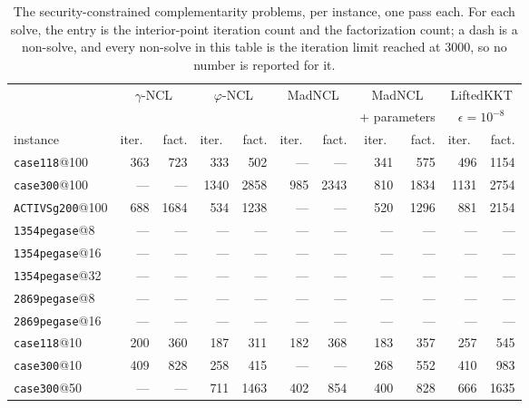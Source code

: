 \begin{table}[tbp]\centering\small\setlength{\tabcolsep}{3pt}
\caption{The security-constrained complementarity problems, per instance, one pass each. For each solve, the entry is the interior-point iteration count and the factorization count; a dash is a non-solve, and every non-solve in this table is the iteration limit reached at 3000, so no number is reported for it.}
\label{tab:gpu-scopf}
\begin{tabular}{lrrrrrrrrrr}\toprule
 & \multicolumn{2}{c}{$\gamma$-NCL} & \multicolumn{2}{c}{$\varphi$-NCL} & \multicolumn{2}{c}{MadNCL} & \multicolumn{2}{c}{MadNCL} & \multicolumn{2}{c}{LiftedKKT} \\
 & \multicolumn{2}{c}{} & \multicolumn{2}{c}{} & \multicolumn{2}{c}{} & \multicolumn{2}{c}{+ parameters} & \multicolumn{2}{c}{$\epsilon=10^{-8}$} \\
\cmidrule(lr){2-3} \cmidrule(lr){4-5} \cmidrule(lr){6-7} \cmidrule(lr){8-9} \cmidrule(lr){10-11}
instance & iter.\ & fact. & iter.\ & fact. & iter.\ & fact. & iter.\ & fact. & iter.\ & fact. \\\midrule
\texttt{case118}@100 & 363 & 723 & 333 & 502 & --- & --- & 341 & 575 & 496 & 1154 \\
\texttt{case300}@100 & --- & --- & 1340 & 2858 & 985 & 2343 & 810 & 1834 & 1131 & 2754 \\
\texttt{ACTIVSg200}@100 & 688 & 1684 & 534 & 1238 & --- & --- & 520 & 1296 & 881 & 2154 \\
\texttt{1354pegase}@8 & --- & --- & --- & --- & --- & --- & --- & --- & --- & --- \\
\texttt{1354pegase}@16 & --- & --- & --- & --- & --- & --- & --- & --- & --- & --- \\
\texttt{1354pegase}@32 & --- & --- & --- & --- & --- & --- & --- & --- & --- & --- \\
\texttt{2869pegase}@8 & --- & --- & --- & --- & --- & --- & --- & --- & --- & --- \\
\texttt{2869pegase}@16 & --- & --- & --- & --- & --- & --- & --- & --- & --- & --- \\
\texttt{case118}@10 & 200 & 360 & 187 & 311 & 182 & 368 & 183 & 357 & 257 & 545 \\
\texttt{case300}@10 & 409 & 828 & 258 & 415 & --- & --- & 268 & 552 & 410 & 983 \\
\texttt{case300}@50 & --- & --- & 711 & 1463 & 402 & 854 & 400 & 828 & 666 & 1635 \\

\end{tabular}
\end{table}
